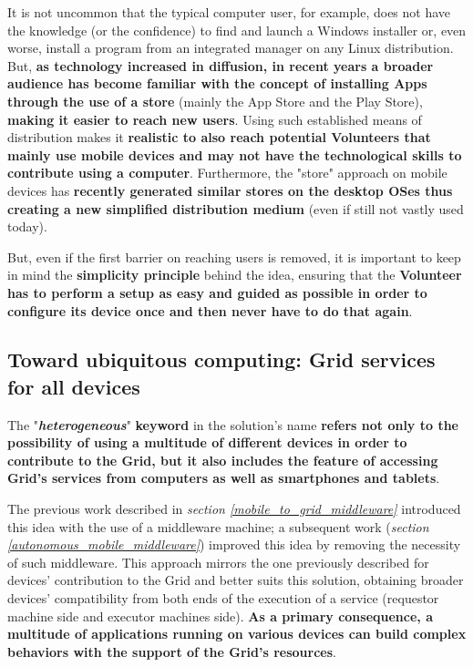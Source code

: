 It is not uncommon that the typical computer user, for example, does not have the knowledge (or the confidence) to find and launch a Windows installer or, even worse, install a program from an integrated manager on any Linux distribution. But, \textbf{as technology increased in diffusion, in recent years a broader audience has become familiar with the concept of installing Apps through the use of a store} (mainly the App Store and the Play Store), \textbf{making it easier to reach new users}. Using such established means of distribution makes it \textbf{realistic to also reach potential Volunteers that mainly use mobile devices and may not have the technological skills to contribute using a computer}. Furthermore, the "store" approach on mobile devices has \textbf{recently generated similar stores on the desktop OSes thus} \textbf{creating a new simplified distribution medium} (even if still not vastly used today).

But, even if the first barrier on reaching users is removed, it is important to keep in mind the \textbf{simplicity principle} behind the idea, ensuring that the \textbf{Volunteer has to perform a setup as easy and guided as possible in order to configure its device once and then never have to do that again}.

\subsection{Toward ubiquitous computing: Grid services for all devices}\label{grid_services_for_all_devices}
The "\textbf{\textit{heterogeneous}}" \textbf{keyword} in the solution's name \textbf{refers not only to the possibility of using a multitude of different devices in order to contribute to the Grid, but it also includes the feature of accessing Grid's services from computers as well as smartphones and tablets}.

The previous work described in \textit{section \ref{mobile_to_grid_middleware}} introduced this idea with the use of a middleware machine; a subsequent work (\textit{section \ref{autonomous_mobile_middleware}}) improved this idea by removing the necessity of such middleware. This approach mirrors the one previously described for devices' contribution to the Grid and better suits this solution, obtaining broader devices' compatibility from both ends of the execution of a service (requestor machine side and executor machines side). \textbf{As a primary consequence, a multitude of applications running on various devices can build complex behaviors with the support of the Grid's resources}.

